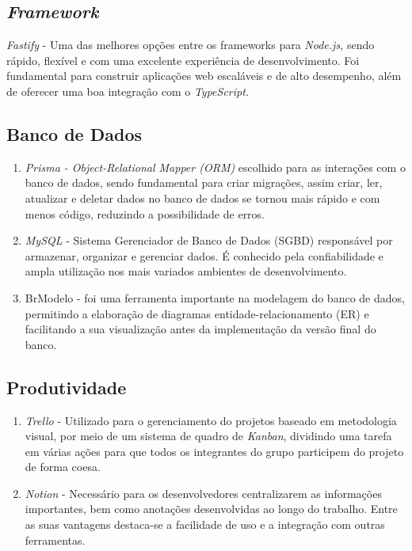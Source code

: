 \subsection{\textit{Framework}}
\textit{Fastify} - Uma das melhores opções entre os frameworks para \textit{Node.js,} sendo rápido, flexível e com uma excelente experiência de desenvolvimento. Foi fundamental para construir aplicações web escaláveis e de alto desempenho, além de oferecer uma boa integração com o \textit{TypeScript.}

\subsection{Banco de Dados}

\begin{enumerate}

	\item \textit{Prisma - Object-Relational Mapper (ORM)} escolhido para as interações com o banco de dados, sendo fundamental para criar migrações, assim criar, ler, atualizar e deletar dados no banco de dados se tornou mais rápido e com menos código, reduzindo a possibilidade de erros.
	
	\item \textit{MySQL} - Sistema Gerenciador de Banco de Dados (SGBD) responsável por armazenar, organizar e gerenciar dados. É conhecido pela confiabilidade e ampla utilização nos mais variados ambientes de desenvolvimento.
	
	\item BrModelo -  foi uma ferramenta importante na modelagem do banco de dados, permitindo a elaboração de diagramas entidade-relacionamento (ER) e facilitando a sua visualização antes da implementação da versão final do banco.
	
\end{enumerate}

\subsection{Produtividade}

\begin{enumerate}
	
	\item \textit{Trello} - Utilizado para o gerenciamento do projetos baseado em metodologia visual, por meio de um sistema de quadro de \textit{Kanban}, dividindo uma tarefa em várias ações para que todos os integrantes do grupo participem do projeto de forma coesa.
	
	\item \textit{ Notion} -  Necessário para os desenvolvedores centralizarem as informações importantes, bem como anotações desenvolvidas ao longo do trabalho. Entre as suas vantagens destaca-se a facilidade de uso e a integração com outras ferramentas.
	
\end{enumerate}


